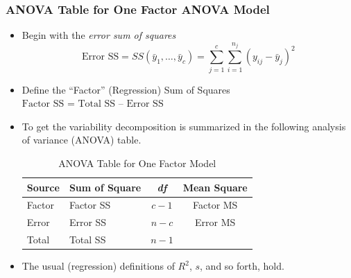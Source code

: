\begin{frame}%
 \frametitle{ANOVA Table for One Factor ANOVA Model}
   \begin{itemize}
    \item Begin with the  \textit{error sum of
squares}
\begin{equation*}
\text{Error SS}=SS(\bar{y}_{1},\ldots ,\bar{y}_{c})=\sum_{j=1}^{c}%
\sum_{i=1}^{n_{j}}(y_{ij}-\bar{y}_{j})^{2}
\end{equation*}%
\item Define the ``Factor'' (Regression) Sum of Squares $\text{Factor SS = Total SS -- Error SS}$
\item To get the
variability decomposition is summarized in the following analysis of
variance (ANOVA) table.

  \begin{center}  \begin{table}[h] \caption{ ANOVA
Table for One Factor Model}
\begin{tabular}{l|lcc}
\hline Source & Sum of Square & \textit{df} & Mean Square \\
 \hline
Factor & Factor SS &$c-1$ & Factor MS \\
Error &Error SS &$n-c$ & Error MS \\
Total & Total SS & $n-1$ &
 \\ \hline
\end{tabular}
\end{table}  \end{center}  
\item The usual (regression) definitions of $R^2$, $s$, and so
forth, hold.
     \end{itemize}

    \end{frame}

